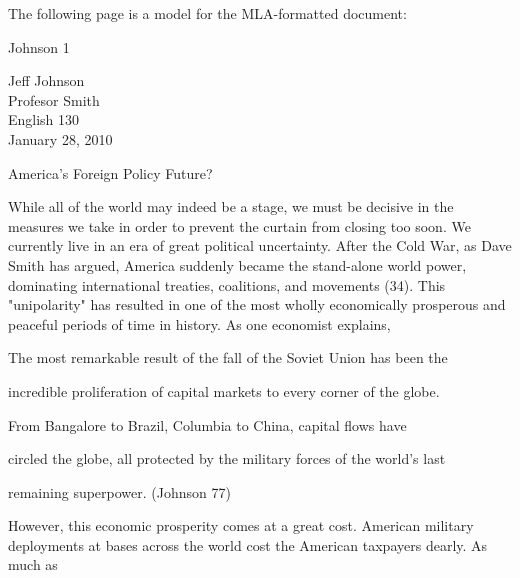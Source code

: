 The following page is a model for the MLA-formatted document:

\newpage

\thispagestyle{empty}
\begin{flushright}Johnson 1\end{flushright}
\bigskip
\begin{Spacing}{2}
Jeff Johnson\\
Profesor Smith\\
English 130\\
January 28, 2010
\end{Spacing}
\begin{center}
America's Foreign Policy Future?
\end{center}
\begin{Spacing}{2}

\hspace{.4in}While all of the world may indeed be a stage, we must be decisive in the 
measures we take in order to prevent the curtain from closing too soon. We currently 
live in an era of great political uncertainty. After the Cold War, as Dave Smith has argued, 
America suddenly became the stand-alone world power, dominating international 
treaties, coalitions, and movements (34). This "unipolarity" has resulted in one of the 
most wholly economically prosperous and peaceful periods of time in history. As one 
economist explains,

\hspace{.8in}The most remarkable result of the fall of the Soviet Union has been the

\hspace{.8in}incredible proliferation of capital markets to every corner of the globe.

\hspace{.8in}From Bangalore to Brazil, Columbia to China, capital flows have  

\hspace{.8in}circled the globe, all protected by the military forces of the world's last 

\hspace{.8in}remaining superpower. (Johnson 77)

However, this economic prosperity comes at a great cost. American military 
deployments at bases across the world cost the American taxpayers dearly. As much as


\end{Spacing}
\newpage

